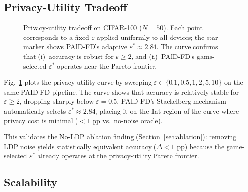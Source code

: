 \subsection{Privacy-Utility Tradeoff}\label{sec:privacy_utility}

\begin{figure}[t]
\centering
\caption{Privacy-utility tradeoff on CIFAR-100 ($N = 50$).
Each point corresponds to a fixed $\varepsilon$ applied uniformly to all
devices; the star marker shows PAID-FD's adaptive $\varepsilon^* \approx 2.84$.
The curve confirms that (i)~accuracy is robust for $\varepsilon \geq 2$, and
(ii)~PAID-FD's game-selected $\varepsilon^*$ operates near the Pareto frontier.}
\label{fig:privacy_utility}
\end{figure}

Fig.~\ref{fig:privacy_utility} plots the privacy-utility curve by sweeping
$\varepsilon \in \{0.1, 0.5, 1, 2, 5, 10\}$ on the same PAID-FD pipeline.
The curve shows that accuracy is relatively stable for $\varepsilon \geq 2$,
dropping sharply below $\varepsilon = 0.5$.
PAID-FD's Stackelberg mechanism automatically selects
$\varepsilon^* \approx 2.84$, placing it on the flat region of the curve
where privacy cost is minimal ($< 1$ pp vs.\ no-noise oracle).

This validates the No-LDP ablation finding (Section~\ref{sec:ablation}):
removing LDP noise yields statistically equivalent accuracy ($\Delta < 1$ pp)
because the game-selected $\varepsilon^*$ already operates at the
privacy-utility Pareto frontier.

\subsection{Scalability}\label{sec:scalability}


